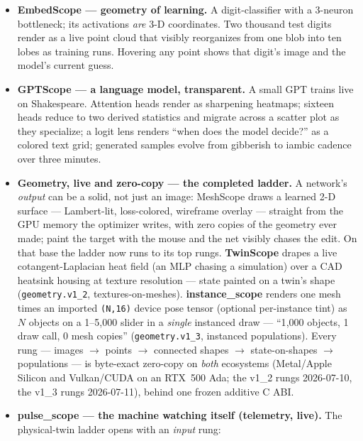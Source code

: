 \documentclass[11pt]{article}
\begin{document}
\begin{itemize}
  \item \textbf{EmbedScope --- geometry of learning.} A digit-classifier with
        a 3-neuron bottleneck; its activations \emph{are} 3-D coordinates.
        Two thousand test digits render as a live point cloud that visibly
        reorganizes from one blob into ten lobes as training runs. Hovering
        any point shows that digit's image and the model's current guess.
  \item \textbf{GPTScope --- a language model, transparent.} A small GPT
        trains live on Shakespeare. Attention heads render as sharpening
        heatmaps; sixteen heads reduce to two derived statistics and migrate
        across a scatter plot as they specialize; a logit lens renders ``when
        does the model decide?'' as a colored text grid; generated samples
        evolve from gibberish to iambic cadence over three minutes.
  \item \textbf{Geometry, live and zero-copy --- the completed ladder.} A
        network's \emph{output} can be a solid, not just an image: MeshScope
        draws a learned 2-D surface --- Lambert-lit, loss-colored, wireframe
        overlay --- straight from the GPU memory the optimizer writes, with zero
        copies of the geometry ever made; paint the target with the mouse and
        the net visibly chases the edit. On that base the ladder now runs to its
        top rungs. \textbf{TwinScope} drapes a live cotangent-Laplacian heat
        field (an MLP chasing a simulation) over a CAD heatsink housing at
        texture resolution --- state painted on a twin's shape
        (\texttt{geometry.v1\_2}, textures-on-meshes). \textbf{instance\_scope}
        renders one mesh times an imported \texttt{(N,16)} device pose tensor
        (optional per-instance tint) as $N$ objects on a 1--5{,}000 slider in a
        \emph{single} instanced draw --- ``1{,}000 objects, 1 draw call, 0 mesh
        copies'' (\texttt{geometry.v1\_3}, instanced populations). Every rung
        --- images $\rightarrow$ points $\rightarrow$ connected shapes
        $\rightarrow$ state-on-shapes $\rightarrow$ populations --- is
        byte-exact zero-copy on \emph{both} ecosystems (Metal/Apple Silicon and
        Vulkan/CUDA on an RTX~500 Ada; the v1\_2 rungs 2026-07-10, the v1\_3
        rungs 2026-07-11), behind one frozen additive C ABI.
  \item \textbf{pulse\_scope --- the machine watching itself (telemetry,
        live).} The physical-twin ladder opens with an \emph{input} rung:

\end{itemize}
\end{document}
